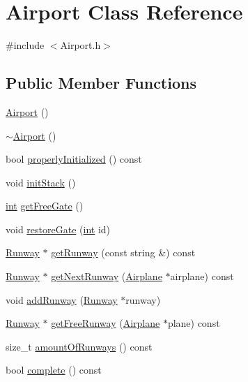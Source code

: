 \hypertarget{classAirport}{}\section{Airport Class Reference}
\label{classAirport}


{\ttfamily \#include $<$Airport.\+h$>$}

\subsection*{Public Member Functions}
\begin{DoxyCompactItemize}
\item 
\hyperlink{classAirport_a2fc0f2402c94225b9deaf76176bb887f}{Airport} ()
\item 
\hyperlink{classAirport_a2c42073a186171586f3ac66d84af97ca}{$\sim$\+Airport} ()
\item 
bool \hyperlink{classAirport_a1ac3a730b557a36ac7521cce6ab64722}{properly\+Initialized} () const 
\item 
void \hyperlink{classAirport_a2a4915cb5db8ff9a992c262af3f333cb}{init\+Stack} ()
\item 
\hyperlink{CMakeCache_8txt_a79a3d8790b2588b09777910863574e09}{int} \hyperlink{classAirport_a73b57b192084fb8082d912da70beb5b0}{get\+Free\+Gate} ()
\item 
void \hyperlink{classAirport_ad93ec78d36fa040b97e6ff2a806e5885}{restore\+Gate} (\hyperlink{CMakeCache_8txt_a79a3d8790b2588b09777910863574e09}{int} id)
\item 
\hyperlink{classRunway}{Runway} $\ast$ \hyperlink{classAirport_a15405cc39a7a397466fff1d54cc738d1}{get\+Runway} (const string \&) const 
\item 
\hyperlink{classRunway}{Runway} $\ast$ \hyperlink{classAirport_a894669e2c8865a6c0442004e7e75063c}{get\+Next\+Runway} (\hyperlink{classAirplane}{Airplane} $\ast$airplane) const 
\item 
void \hyperlink{classAirport_a346e81f1bbb8b9eb9a0eee341d947fc1}{add\+Runway} (\hyperlink{classRunway}{Runway} $\ast$runway)
\item 
\hyperlink{classRunway}{Runway} $\ast$ \hyperlink{classAirport_a760fd9c19e06fa37362006e42153ca0a}{get\+Free\+Runway} (\hyperlink{classAirplane}{Airplane} $\ast$plane) const 
\item 
size\+\_\+t \hyperlink{classAirport_a587d39bfd3934a70f94b42f40fe72245}{amount\+Of\+Runways} () const 
\item 
bool \hyperlink{classAirport_a76819017f88f563183bd16a0b4da4e40}{complete} () const 

\end{DoxyCompactItemize}

